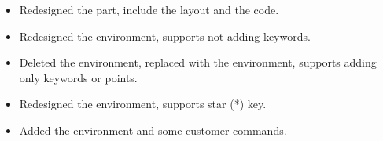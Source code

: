 \begin{itemize}
    \item Redesigned the  part, include the layout and the code.
    \item Redesigned the  environment, supports not adding keywords.
    \item Deleted the  environment, replaced with the  environment, supports adding only keywords or points.
    \item Redesigned the  environment, supports star (*) key. 
    \item Added the  environment and some customer commands.
\end{itemize}